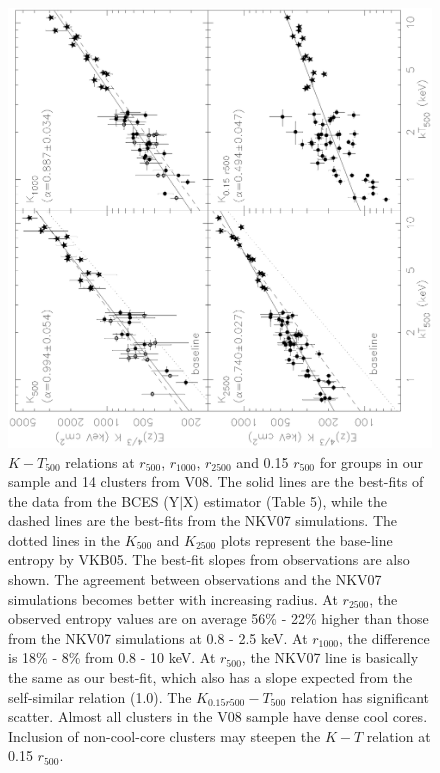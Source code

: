 \documentclass{aastex}
\begin{document}
\begin{figure}
\centerline{\includegraphics[height=0.7\linewidth,angle=270]{f12.ps}}
  \caption{$K - T_{500}$ relations at $r_{500}$, $r_{1000}$, $r_{2500}$ and 0.15 $r_{500}$
for groups in our sample and 14 clusters from V08. The solid lines are the best-fits of
the data from the BCES (Y$|$X) estimator (Table 5), while the dashed lines are
the best-fits from the NKV07 simulations. The dotted lines in the $K_{500}$ and $K_{2500}$
plots represent the base-line entropy by VKB05.
The best-fit slopes from observations are
also shown. The agreement between observations and the NKV07 simulations becomes better
with increasing radius. At $r_{2500}$, the observed entropy values are on average 56\% - 22\%
higher than those from the NKV07 simulations at 0.8 - 2.5 keV.
At $r_{1000}$, the difference is 18\% - 8\% from 0.8 - 10 keV.
At $r_{500}$, the NKV07 line is basically the same as our best-fit, which also
has a slope expected from the self-similar relation (1.0).
The $K_{0.15 r500} - T_{500}$ relation has significant scatter.
Almost all clusters in the V08 sample have dense cool cores. Inclusion of
non-cool-core clusters may steepen the $K - T$ relation at 0.15 $r_{500}$.
}
\end{figure}
\end{document}
